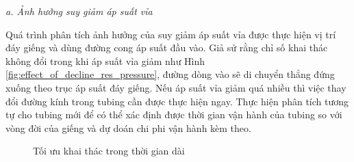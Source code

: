 \documentclass[12pt,a4paper]{report}
\begin{document}
\textit{a. Ảnh hưởng suy giảm áp suất vỉa}

Quá trình phân tích ảnh hưởng của suy giảm áp suất vỉa được thực hiện vị trí đáy giếng và dùng đường cong áp suất đầu vào. Giả sử rằng chỉ số khai thác không đổi trong khi áp suất vỉa giảm như Hình \ref{fig:effect_of_decline_res_pressure}, đường dòng vào sẽ di chuyển thẳng đứng xuống theo trục áp suất đáy giếng. Nếu áp suất vỉa giảm quá nhiều thì việc thay đổi đường kính trong tubing cần được thực hiện ngay. Thực hiện phân tích tương tự cho tubing mới để có thể xác định được thời gian vận hành của tubing so với vòng đời của giếng và dự doán chi phi vận hành kèm theo.
\newpage
	\begin{figure}[h]
		\centering
		\hfill
		\caption[Tối ưu khai thác trong thời gian dài]{Tối ưu khai thác trong thời gian dài \cite{jansen2004modelling}}
	\end{figure}
\end{document}
